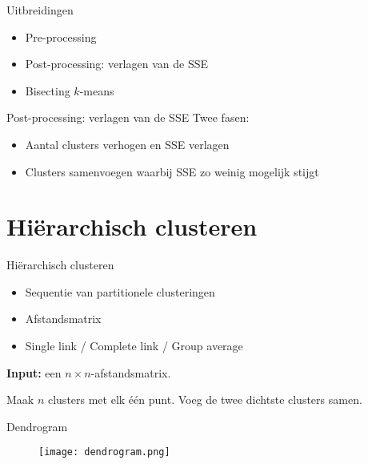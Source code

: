 \documentclass{beamer}
\newcommand{\kmeans}{$k$-means}
\begin{document}
\begin{frame}{Uitbreidingen}
 \begin{itemize}
  \item Pre-processing
  \item Post-processing: verlagen van de SSE
  \item Bisecting \kmeans
 \end{itemize}
\end{frame}

\begin{frame}{Post-processing: verlagen van de SSE}
 Twee fasen:
 \begin{itemize}
  \item Aantal clusters verhogen en SSE verlagen
  \item Clusters samenvoegen waarbij SSE zo weinig mogelijk stijgt
 \end{itemize}
\end{frame}

\section{Hiërarchisch clusteren}
\begin{frame}{Hiërarchisch clusteren}
 \begin{itemize}
  \item Sequentie van partitionele clusteringen
  \item Afstandsmatrix
  \item Single link / Complete link / Group average
 \end{itemize}
\begin{algorithm}[H]
\textbf{Input:} een $n\times n$-afstandsmatrix.\\
\begin{algorithmic}[1]
\STATE Maak $n$ clusters met elk één punt.
\STATE Voeg de twee dichtste clusters samen.
\ENDWHILE
\end{algorithmic}
\caption{Hiërarchisch clusteren}
\end{algorithm}
\end{frame}

\begin{frame}{Dendrogram}
 \begin{figure}[!ht]\centering
  \texttt{[image: dendrogram.png]}
 \end{figure}
\end{frame}
\end{document}
